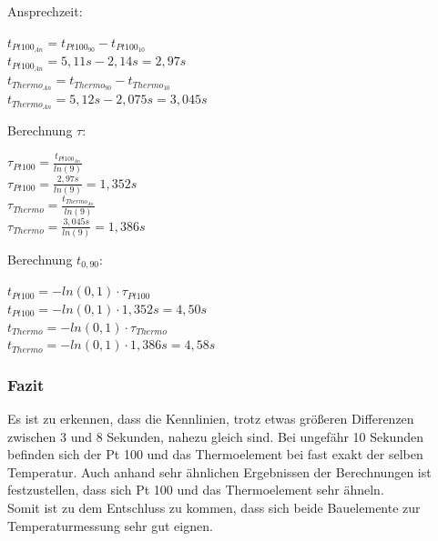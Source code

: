 \documentclass[a4paper,11pt,oneside]{article}
\begin{document}
Ansprechzeit:\\
\begin{center}
$t_{Pt100_{An}} = t_{Pt100_{90}} - t_{Pt100_{10}}$\\
$t_{Pt100_{An}} = 5,11s-2,14s=2,97s$\\
\vspace{0.5cm}
$t_{Thermo_{An}} = t_{Thermo_{90}} - t_{Thermo_{10}}$\\
$t_{Thermo_{An}} = 5,12s-2,075s = 3,045s$\\

\end{center}

Berechnung $\tau$:\\
\begin{center}
$\tau_{Pt100} = \frac{t_{Pt100_{An}}}{ln(9)}$\\
$\tau_{Pt100} = \frac{2,97s}{ln(9)} = 1,352s$\\
\vspace{0.5cm}
$\tau_{Thermo} = \frac{t_{Thermo_{An}}}{ln(9)}$\\
$\tau_{Thermo} = \frac{3,045s}{ln(9)} = 1,386s$\\
\end{center}
Berechnung $t_{0,90}$:\\

\begin{center}
$t_{Pt100} = -ln(0,1)\cdot \tau_{Pt100}$\\
$t_{Pt100} = -ln(0,1)\cdot 1,352s = 4,50s$\\
\vspace{0.5cm}
$t_{Thermo} = -ln(0,1)\cdot \tau_{Thermo}$\\
$t_{Thermo} = -ln(0,1)\cdot 1,386s = 4,58s$
\end{center}


\subsubsection{Fazit}
Es ist zu erkennen, dass die Kennlinien, trotz etwas größeren Differenzen zwischen 3 und 8 Sekunden, nahezu gleich sind. Bei ungefähr 10 Sekunden befinden sich der Pt 100 und das Thermoelement bei fast exakt der selben Temperatur. Auch anhand sehr ähnlichen Ergebnissen der Berechnungen ist festzustellen, dass sich Pt 100 und das Thermoelement sehr ähneln. \\
Somit ist zu dem Entschluss zu kommen, dass sich beide Bauelemente zur Temperaturmessung sehr gut eignen. 
\end{document}
